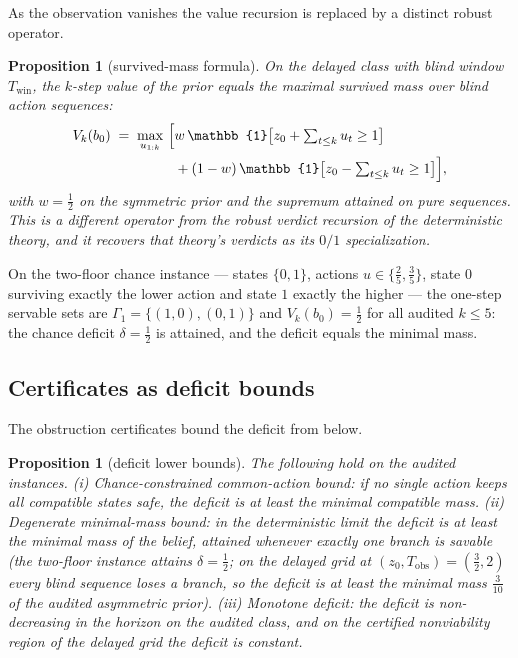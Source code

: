 \documentclass[10pt,twocolumn]{article}
\theoremstyle{plain}
\newtheorem{proposition}[theorem]{Proposition}
\theoremstyle{definition}
\theoremstyle{remark}
\begin{document}
As the observation vanishes the value recursion is replaced by a
distinct robust operator.

\begin{proposition}[survived-mass formula]\label{prop:degen}
On the delayed class with blind window \(T_{\mathrm{win}}\), the
\(k\)-step value of the prior equals the maximal survived mass over
blind action sequences:
\begin{align*}
V_{k}(b_{0}) \;=\; \max_{u_{1:k}}\ \Bigl[
& w\,\mathbb{1}\bigl[z_{0} + \textstyle\sum_{t \le k} u_{t} \ge 1\bigr]\\
& + (1 - w)\,\mathbb{1}\bigl[z_{0} - \textstyle\sum_{t \le k} u_{t} \ge 1\bigr]
\Bigr],
\end{align*}
with \(w = \tfrac{1}{2}\) on the symmetric prior and the supremum
attained on pure sequences. This is a different operator from the
robust verdict recursion of the deterministic theory, and it recovers
that theory's verdicts as its \(0/1\) specialization.
\end{proposition}

On the two-floor chance instance --- states \(\{0, 1\}\), actions
\(u \in \{\tfrac{2}{5}, \tfrac{3}{5}\}\), state \(0\) surviving exactly
the lower action and state \(1\) exactly the higher --- the one-step
servable sets are \(\Gamma_{1} = \{(1,0), (0,1)\}\) and
\(V_{k}(b_{0}) = \tfrac{1}{2}\) for all audited \(k \le 5\): the
chance deficit \(\delta = \tfrac{1}{2}\) is attained, and the
deficit equals the minimal mass.

\subsection{Certificates as deficit bounds}\label{deficit}

The obstruction certificates bound the deficit from below.

\begin{proposition}[deficit lower bounds]\label{prop:deficit}
The following hold on the audited instances. (i) \emph{Chance-constrained
common-action bound:} if no single action keeps all compatible states
safe, the deficit is at least the minimal compatible mass. (ii)
\emph{Degenerate minimal-mass bound:} in the deterministic limit the
deficit is at least the minimal mass of the belief, attained whenever
exactly one branch is savable (the two-floor instance attains
\(\delta = \tfrac{1}{2}\); on the delayed grid at
\((z_{0}, T_{\mathrm{obs}}) = (\tfrac{3}{2}, 2)\) every blind sequence
loses a branch, so the deficit is at least the minimal mass
\(\tfrac{3}{10}\) of the audited asymmetric prior). (iii) \emph{Monotone
deficit:} the deficit is non-decreasing in the horizon on the audited
class, and on the certified nonviability region of the delayed grid the
deficit is constant.
\end{proposition}
\end{document}
